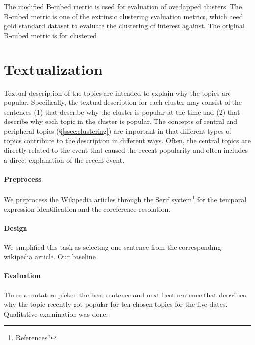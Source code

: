 \documentclass[11pt]{article}
\begin{document}
The modified B-cubed metric \cite{Amigo:09} is used for evaluation of overlapped clusters. The B-cubed metric is one of the extrinsic clustering evaluation metrics, which need gold standard dataset to evaluate the clustering of interest against. The original B-cubed metric is for clustered 

\section{Textualization}

Textual description of the topics are intended to explain why the topics are popular. Specifically, the textual description for each cluster may consist of the sentences (1) that describe why the cluster is popular at the time and (2) that describe why each topic in the cluster is popular. The concepts of central and peripheral topics (\S\ref{ssec:clustering}) are important in that different types of topics contribute to the description in different ways. Often, the central topics are directly related to the event that caused the recent popularity and often includes a direct explanation of the recent event. 

\paragraph {Preprocess}
We preprocess the Wikipedia articles through the Serif system\footnote{References?} for the temporal expression identification and the coreference resolution.

\paragraph {Design}
We simplified this task as selecting one sentence from the corresponding wikipedia article. Our baseline 

\paragraph {Evaluation}
Three annotators picked the best sentence and next best sentence that describes why the topic recently got popular for ten chosen topics for the five dates. Qualitative examination was done.
\end{document}
